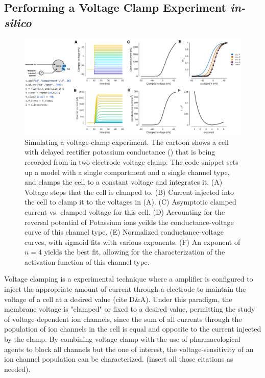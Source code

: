 \documentclass{frontiersSCNS} %
\begin{document}
%
%
%
%
%
%




\subsection{Performing a Voltage Clamp Experiment \textit{in-silico}}

\begin{figure}[!htb]
	\centering
	\includegraphics[width=1.0\linewidth]{gfx/figure_clamp}
	\caption{Simulating a voltage-clamp experiment. The cartoon shows a cell with delayed rectifier potassium conductance (\cite{liuModelNeuronActivitydependent1998}) that is being recorded from in two-electrode voltage clamp. The code snippet sets up a model with a single compartment and a single channel type, and clamps the cell to a constant voltage and integrates it. (A) Voltage steps that the cell is clamped to. (B) Current injected into the cell to clamp it to the voltages in (A). (C) Asymptotic clamped current vs. clamped voltage for this cell. (D) Accounting for the reversal potential of Potassium ions yeilds the conductance-voltage curve of this channel type. (E) Normalized conductance-voltage curves, with sigmoid fits with various exponents. (F) An exponent of $n=4$ yields the best fit, allowing for the characterization of the activation function of this channel type. }
	\label{fig:figureclamp}
\end{figure}

Voltage clamping is a experimental technique where a amplifier is configured to inject the appropriate amount of current through a electrode to maintain the voltage of a cell at a desired value (cite D\&A). Under this paradigm, the membrane voltage is "clamped" or fixed to a desired value, permitting the study of voltage-dependent ion channels, since the sum of all currents through the population of ion channels in the cell is equal and opposite to the current injected by the clamp. By combining voltage clamp with the use of pharmacological agents to block all channels but the one of interest, the voltage-sensitivity of an ion channel population can be characterized. (insert all those citations as needed). 
\end{document}
